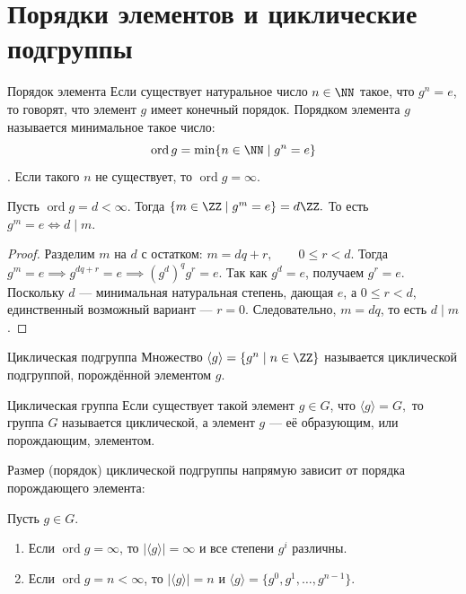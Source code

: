 
\section{Порядки элементов и циклические подгруппы}

\begin{Definition}{Порядок элемента}{}
	Если существует натуральное число $n \in \NN$ такое, что $g^n = e$, то говорят, что элемент $g$ имеет конечный порядок. Порядком элемента $g$ называется минимальное такое число:
	\[
	\operatorname{ord} g = \min\{n \in \NN \mid g^n = e\}
	\].
	Если такого $n$ не существует, то $\operatorname{ord} g = \infty$.
\end{Definition}

\begin{Proposition}{}{}
	Пусть $\operatorname{ord} g = d < \infty$. Тогда $\{m \in \ZZ \mid g^m = e\} = d\ZZ.$
	То есть $g^m = e \iff d \mid m.$
\end{Proposition}

\begin{proof}
Разделим $m$ на $d$ с остатком: $m = dq + r, \qquad 0 \le r < d.$
Тогда $g^m = e \implies g^{dq+r} = e \implies (g^d)^qg^r = e.$
Так как $g^d = e$, получаем $g^r = e$. Поскольку $d$ — минимальная натуральная степень, дающая $e$, а $0 \le r < d$, единственный возможный вариант — $r = 0$. Следовательно, $m = dq$, то есть $d \mid m$.
\end{proof}

\begin{Definition}{Циклическая подгруппа}{}
	Множество $\langle g \rangle = \{g^n \mid n \in \ZZ\}$ называется циклической подгруппой, порождённой элементом $g$.
\end{Definition}

\begin{Definition}{Циклическая группа}{}
	Если существует такой элемент $g \in G$, что $\langle g \rangle = G,$
	то группа $G$ называется циклической, а элемент $g$ — её образующим, или порождающим, элементом.
\end{Definition}

Размер (порядок) циклической подгруппы напрямую зависит от порядка порождающего элемента:
\begin{Proposition}{}{}
	Пусть $g \in G$.
	\begin{enumerate}
		\item Если $\operatorname{ord} g = \infty$, то $|\langle g \rangle| = \infty$ и все степени $g^i$ различны.
		\item Если $\operatorname{ord} g = n < \infty$, то $|\langle g \rangle| = n$ и $\langle g \rangle = \{g^0,g^1,\dots,g^{n-1}\}$.
	\end{enumerate}
\end{Proposition}

